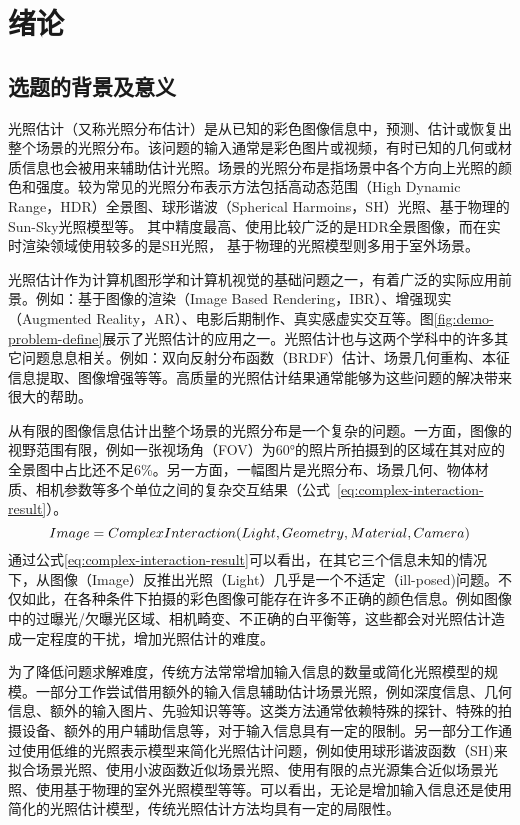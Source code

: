 \chapter{绪论}\label{chap:introduction}

\section{选题的背景及意义}
光照估计（又称光照分布估计）是从已知的彩色图像信息中，预测、估计或恢复出整个场景的光照分布。该问题的输入通常是彩色图片或视频，有时已知的几何或材质信息也会被用来辅助估计光照。场景的光照分布是指场景中各个方向上光照的颜色和强度。较为常见的光照分布表示方法包括高动态范围（High Dynamic Range，HDR）全景图、球形谐波（Spherical Harmoins，SH）光照、基于物理的Sun-Sky光照模型等。
其中精度最高、使用比较广泛的是HDR全景图像，而在实时渲染领域使用较多的是SH光照， 基于物理的光照模型则多用于室外场景。

光照估计作为计算机图形学和计算机视觉的基础问题之一，有着广泛的实际应用前景。例如：基于图像的渲染（Image Based Rendering，IBR）、增强现实（Augmented Reality，AR）、电影后期制作、真实感虚实交互等。图\ref{fig:demo-problem-define}展示了光照估计的应用之一。光照估计也与这两个学科中的许多其它问题息息相关。例如：双向反射分布函数（BRDF）估计、场景几何重构、本征信息提取、图像增强等等。高质量的光照估计结果通常能够为这些问题的解决带来很大的帮助。 

从有限的图像信息估计出整个场景的光照分布是一个复杂的问题。一方面，图像的视野范围有限，例如一张视场角（FOV）为60°的照片所拍摄到的区域在其对应的全景图中占比还不足6\%。另一方面，一幅图片是光照分布、场景几何、物体材质、相机参数等多个单位之间的复杂交互结果（公式~\ref{eq:complex-interaction-result}）。
\begin{equation} \centering 
    \label{eq:complex-interaction-result}
    Image = ComplexInteraction(Light, Geometry, Material, Camera)
\end{equation}
通过公式\ref{eq:complex-interaction-result}可以看出，在其它三个信息未知的情况下，从图像（Image）反推出光照（Light）几乎是一个不适定（ill-posed)问题。不仅如此，在各种条件下拍摄的彩色图像可能存在许多不正确的颜色信息。例如图像中的过曝光/欠曝光区域、相机畸变、不正确的白平衡等，这些都会对光照估计造成一定程度的干扰，增加光照估计的难度。

为了降低问题求解难度，传统方法常常增加输入信息的数量或简化光照模型的规模。一部分工作尝试借用额外的输入信息辅助估计场景光照，例如深度信息、几何信息、额外的输入图片、先验知识等等。这类方法通常依赖特殊的探针、特殊的拍摄设备、额外的用户辅助信息等，对于输入信息具有一定的限制。另一部分工作通过使用低维的光照表示模型来简化光照估计问题，例如使用球形谐波函数（SH)来拟合场景光照、使用小波函数近似场景光照、使用有限的点光源集合近似场景光照、使用基于物理的室外光照模型等等。可以看出，无论是增加输入信息还是使用简化的光照估计模型，传统光照估计方法均具有一定的局限性。

